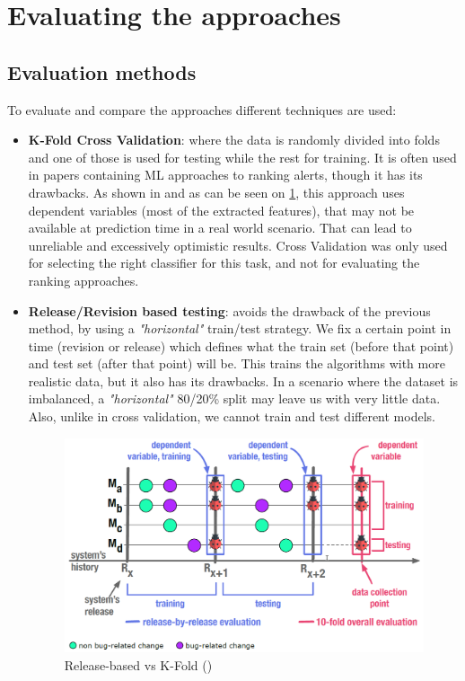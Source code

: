 
\section{Evaluating the approaches}\label{sec:evaluation}

\subsection{Evaluation methods}

To evaluate and compare the approaches different techniques are used: 
\begin{itemize}
	\item \textbf{K-Fold Cross Validation}: where the data is randomly divided into folds and one of those is used for testing while the rest for training. It is often used in papers containing ML approaches to ranking alerts, though it has its drawbacks. As shown in \cite{performance_method_bug} and as can be seen on \cref{kfold_vs_release}, this approach uses dependent variables (most of the extracted features), that may not be available at prediction time in a real world scenario. That can lead to unreliable and excessively optimistic results. Cross Validation was only used for selecting the right classifier for this task, and not for evaluating the ranking approaches.
	\item \textbf{Release/Revision based testing}: avoids the drawback of the previous method, by using a \textit{"horizontal"} train/test strategy. We fix a certain point in time (revision or release) which defines what the train set (before that point) and test set (after that point) will be. This trains the algorithms with more realistic data, but it also has its drawbacks. In a scenario where the dataset is imbalanced, a \textit{"horizontal"} 80/20\% split may leave us with very little data. Also, unlike in cross validation, we cannot train and test different models.
	
	\begin{figure}[H]
		\centering
		\includegraphics[scale=0.3]{./src/release_based_testing.png}
		\caption{Release-based vs K-Fold (\cite{performance_method_bug})}
		\label{kfold_vs_release}
	\end{figure}
	

\end{itemize}
